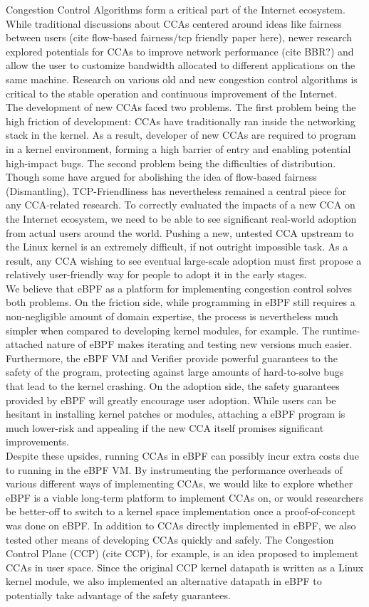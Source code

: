\documentclass[../main.tex]{subfiles}
\begin{document}
Congestion Control Algorithms form a critical part of the Internet ecosystem. While traditional discussions about CCAs centered around ideas like fairness between users (cite flow-based fairness/tcp friendly paper here), newer research explored potentials for CCAs to improve network performance (cite BBR?) and allow the user to customize bandwidth allocated to different applications on the same machine. Research on various old and new congestion control algorithms is critical to the stable operation and continuous improvement of the Internet. \\
The development of new CCAs faced two problems. The first problem being the high friction of development: CCAs have traditionally ran inside the networking stack in the kernel. As a result, developer of new CCAs are required to program in a kernel environment, forming a high barrier of entry and enabling potential high-impact bugs. The second problem being the difficulties of distribution. Though some have argued for abolishing the idea of flow-based fairness (Dismantling), TCP-Friendliness has nevertheless remained a central piece for any CCA-related research. To correctly evaluated the impacts of a new CCA on the Internet ecosystem, we need to be able to see significant real-world adoption from actual users around the world. Pushing a new, untested CCA upstream to the Linux kernel is an extremely difficult, if not outright impossible task. As a result, any CCA wishing to see eventual large-scale adoption must first propose a relatively user-friendly way for people to adopt it in the early stages. \\
We believe that eBPF as a platform for implementing congestion control solves both problems. On the friction side, while programming in eBPF still requires a non-negligible amount of domain expertise, the process is nevertheless much simpler when compared to developing kernel modules, for example. The runtime-attached nature of eBPF makes iterating and testing new versions much easier. Furthermore, the eBPF VM and Verifier provide powerful guarantees to the safety of the program, protecting against large amounts of hard-to-solve bugs that lead to the kernel crashing. On the adoption side, the safety guarantees provided by eBPF will greatly encourage user adoption. While users can be hesitant in installing kernel patches or modules, attaching a eBPF program is much lower-risk and appealing if the new CCA itself promises significant improvements.\\
Despite these upsides, running CCAs in eBPF can possibly incur extra costs due to running in the eBPF VM. By instrumenting the performance overheads of various different ways of implementing CCAs, we would like to explore whether eBPF is a viable long-term platform to implement CCAs on, or would researchers be better-off to switch to a kernel space implementation once a proof-of-concept was done on eBPF. In addition to CCAs directly implemented in eBPF, we also tested other means of developing CCAs quickly and safely. The Congestion Control Plane (CCP) (cite CCP), for example, is an idea proposed to implement CCAs in user space. Since the original CCP kernel datapath is written as a Linux kernel module, we also implemented an alternative datapath in eBPF to potentially take advantage of the safety guarantees.
\end{document}
